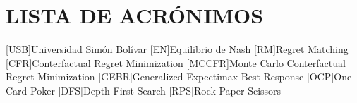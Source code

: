 
\chapter*{LISTA DE ACRÓNIMOS}
\begin{acronym}
[USB]{Universidad Simón Bolívar}
[EN]{Equilibrio de Nash}
[RM]{Regret Matching}
[CFR]{Conterfactual Regret Minimization}
[MCCFR]{Monte Carlo Conterfactual Regret Minimization}
[GEBR]{Generalized Expectimax Best Response}
[OCP]{One Card Poker}
[DFS]{Depth First Search}
[RPS]{Rock Paper Scissors}
\end{acronym}
\clearpage